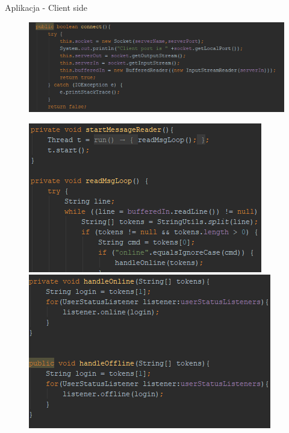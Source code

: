 \documentclass{beamer}
\begin{document}
\begin{frame}{Aplikacja - Client side}
\begin{figure}
 \includegraphics[scale=0.5]{client_socket}
\end{figure}
\begin{figure}

 \centering
  \begin{minipage}[b]{0.48\textwidth}
\includegraphics[width=\textwidth,left]{client_read}
\end{minipage}
  \hfill
  \begin{minipage}[b]{0.48\textwidth}
\includegraphics[width=\textwidth,right]{client_handle}
 \end{minipage}
\end{figure}
\end{frame}
\end{document}
